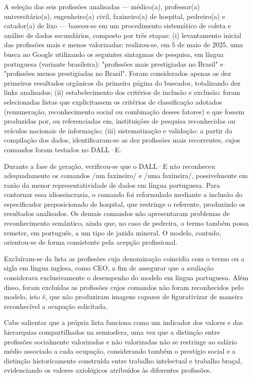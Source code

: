 \documentclass[portuguese]{textolivre}
\begin{document}
A seleção das seis profissões analisadas — médico(a), professor(a) universitário(a), engenheiro(a) civil, faxineiro(a) de hospital, pedreiro(a) e catador(a) de lixo — baseou-se em um procedimento sistemático de coleta e análise de dados secundários, composto por três etapas: (i) levantamento inicial das profissões mais e menos valorizadas: realizou-se, em 5 de maio de 2025, uma busca no Google utilizando os seguintes sintagmas de pesquisa, em língua portuguesa (variante brasileira): "profissões mais prestigiadas no Brasil" e "profissões menos prestigiadas no Brasil". Foram considerados apenas os dez primeiros resultados orgânicos da primeira página do buscador, totalizando dez links analisados; (ii) estabelecimento dos critérios de inclusão e exclusão: foram selecionadas listas que explicitassem os critérios de classificação adotados (remuneração, reconhecimento social ou combinação desses fatores) e que fossem produzidas por, ou referenciadas em, instituições de pesquisa reconhecidas ou veículos nacionais de informação; (iii) sistematização e validação: a partir da compilação dos dados, identificaram-se as dez profissões mais recorrentes, cujos comandos foram testados no DALL·E.

Durante a fase de geração, verificou-se que o DALL·E não reconheceu adequadamente os comandos /um faxineiro/ e /uma faxineira/, possivelmente em razão da menor representatividade de dados em língua portuguesa. Para contornar essa idiossincrasia, o comando foi reformulado mediante a inclusão do especificador preposicionado de hospital, que restringe o referente, produzindo os resultados analisados. Os demais comandos não apresentaram problemas de reconhecimento semântico, ainda que, no caso de pedreira, o termo também possa remeter, em português, a um tipo de jazida mineral. O modelo, contudo, orientou-se de forma consistente pela acepção profissional.

Excluíram-se da lista as profissões cuja denominação coincidia com o termo ou a sigla em língua inglesa, como CEO, a fim de assegurar que a avaliação considerava exclusivamente o desempenho do modelo em língua portuguesa. Além disso, foram excluídas as profissões cujos comandos não foram reconhecidos pelo modelo, isto é, que não produziram imagens capazes de figurativizar de maneira reconhecível a ocupação solicitada.

Cabe salientar que a própria lista funciona como um indicador dos valores e das hierarquias compartilhados na semiosfera, uma vez que a distinção entre profissões socialmente valorizadas e não valorizadas não se restringe ao salário médio associado a cada ocupação, considerando também o prestígio social e a distinção historicamente construída entre trabalho intelectual e trabalho braçal, evidenciando os valores axiológicos atribuídos às diferentes profissões.
\end{document}
